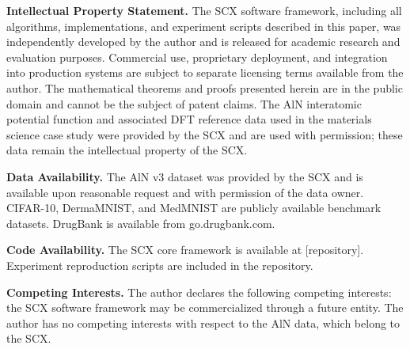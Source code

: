 \documentclass[twocolumn]{article}
\theoremstyle{definition}
\begin{document}
\textbf{Intellectual Property Statement.}
The SCX software framework, including all algorithms, implementations, and experiment scripts described in this paper, was independently developed by the author and is released for academic research and evaluation purposes. Commercial use, proprietary deployment, and integration into production systems are subject to separate licensing terms available from the author. The mathematical theorems and proofs presented herein are in the public domain and cannot be the subject of patent claims. The AlN interatomic potential function and associated DFT reference data used in the materials science case study were provided by the SCX and are used with permission; these data remain the intellectual property of the SCX.

\textbf{Data Availability.}
The AlN v3 dataset was provided by the SCX and is available upon reasonable request and with permission of the data owner. CIFAR-10, DermaMNIST, and MedMNIST are publicly available benchmark datasets. DrugBank is available from go.drugbank.com.

\textbf{Code Availability.}
The SCX core framework is available at [repository]. Experiment reproduction scripts are included in the repository.

\textbf{Competing Interests.}
The author declares the following competing interests: the SCX software framework may be commercialized through a future entity. The author has no competing interests with respect to the AlN data, which belong to the SCX.
\end{document}
